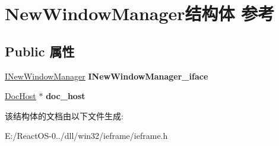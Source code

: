 \hypertarget{struct_new_window_manager}{}\section{New\+Window\+Manager结构体 参考}
\label{struct_new_window_manager}
\subsection*{Public 属性}
\begin{DoxyCompactItemize}
\item 
\mbox{\label{struct_new_window_manager_a6c674d0fee4a79f278cb099542d5f9ab}} 
\hyperlink{interface_i_new_window_manager}{I\+New\+Window\+Manager} {\bfseries I\+New\+Window\+Manager\+\_\+iface}
\item 
\mbox{\label{struct_new_window_manager_aba62dcfe7f0919e20e0562252ed2256c}} 
\hyperlink{struct_doc_host}{Doc\+Host} $\ast$ {\bfseries doc\+\_\+host}
\end{DoxyCompactItemize}


该结构体的文档由以下文件生成\+:\begin{DoxyCompactItemize}
\item 
E\+:/\+React\+O\+S-\/0../dll/win32/ieframe/ieframe.\+h\end{DoxyCompactItemize}

